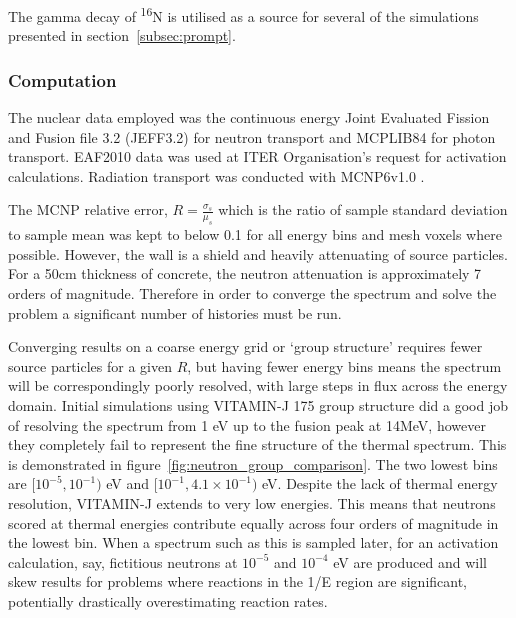The gamma decay of \textsuperscript{16}N is utilised as a source for several of the simulations presented in section~\ref{subsec:prompt}.

\subsubsection{Computation}
\label{subsubsec:rad_tran_comp}
The nuclear data employed was the continuous energy Joint Evaluated Fission and Fusion file 3.2 (JEFF3.2) for neutron transport and MCPLIB84 for photon transport. EAF2010 data was used at ITER Organisation's request for activation calculations. Radiation transport was conducted with MCNP6v1.0 \cite{Goorley2012}.

The MCNP relative error, $R = \frac{\sigma_{s}}{\mu_{s}}$ which is the ratio of sample standard deviation to sample mean was kept to below 0.1 for all energy bins and mesh voxels where possible. However, the wall is a shield and heavily attenuating of source particles. For a 50cm thickness of concrete, the neutron attenuation is approximately 7 orders of magnitude. Therefore in order to converge the spectrum and solve the problem a significant number of histories must be run. 

Converging results on a coarse energy grid or `group structure' requires fewer source particles for a given $R$, but having fewer energy bins means the spectrum will be correspondingly poorly resolved, with large steps in flux across the energy domain. Initial simulations using VITAMIN-J 175 group structure did a good job of resolving the spectrum from 1 eV up to the fusion peak at 14MeV, however they completely fail to represent the fine structure of the thermal spectrum. This is demonstrated in figure~\ref{fig:neutron_group_comparison}. The two lowest bins are $[10^{-5},10^{-1})$ eV and $[10^{-1},4.1\times10^{-1})$ eV. Despite the lack of thermal energy resolution, VITAMIN-J extends to very low energies. This means that neutrons scored at thermal energies contribute equally across four orders of magnitude in the lowest bin. When a spectrum such as this is sampled later, for an activation calculation, say, fictitious neutrons at $10^{-5}$ and $10^{-4}$ eV are produced and will skew results for problems where reactions in the 1/E region are significant, potentially drastically overestimating reaction rates. 

